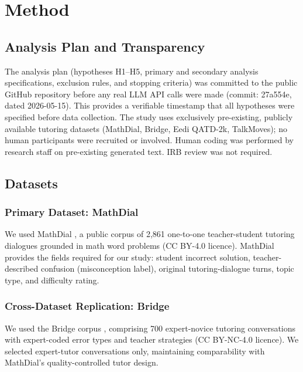 \documentclass[12pt]{article}
\begin{document}
\section{Method}

\subsection{Analysis Plan and Transparency}

The analysis plan (hypotheses H1--H5, primary and secondary analysis specifications,
exclusion rules, and stopping criteria) was committed to the public GitHub repository
before any real LLM API calls were made (commit: 27a554e, dated 2026-05-15). This provides
a verifiable timestamp that all hypotheses were specified before data collection.
The study uses exclusively pre-existing, publicly available tutoring datasets (MathDial,
Bridge, Eedi QATD-2k, TalkMoves); no human participants were recruited or involved.
Human coding was performed by research staff on pre-existing generated text. IRB review
was not required.

\subsection{Datasets}

\subsubsection{Primary Dataset: MathDial}

We used MathDial \citep{macina2023}, a public corpus of 2,861 one-to-one teacher-student
tutoring dialogues grounded in math word problems (CC BY-4.0 licence). MathDial provides
the fields required for our study: student incorrect solution, teacher-described confusion
(misconception label), original tutoring-dialogue turns, topic type, and difficulty rating.

\subsubsection{Cross-Dataset Replication: Bridge}

We used the Bridge corpus \citep{wang2024bridge}, comprising 700 expert-novice tutoring
conversations with expert-coded error types and teacher strategies (CC BY-NC-4.0 licence).
We selected expert-tutor conversations only, maintaining comparability with MathDial's
quality-controlled tutor design.
\end{document}
